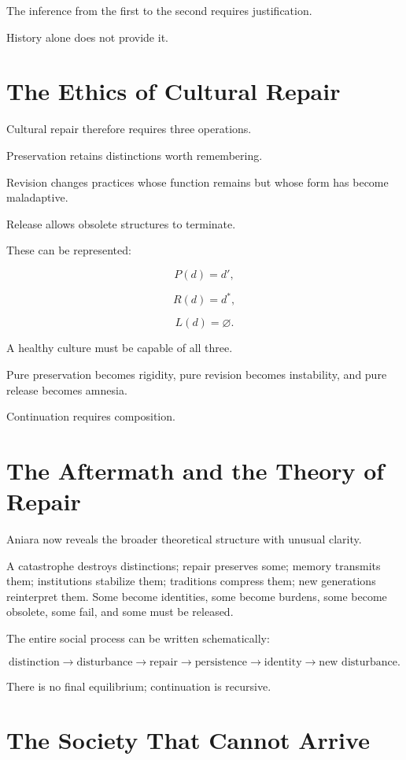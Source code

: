 \documentclass[11pt,oneside]{book}
\theoremstyle{definition}
\theoremstyle{remark}
\begin{document}
The inference from the first to the second requires justification.

History alone does not provide it.

\section{The Ethics of Cultural Repair}

Cultural repair therefore requires three operations.

Preservation retains distinctions worth remembering.

Revision changes practices whose function remains but whose form has become maladaptive.

Release allows obsolete structures to terminate.

These can be represented:

\[
P(d)=d',
\]

\[
R(d)=d^\ast,
\]

\[
L(d)=\varnothing.
\]

A healthy culture must be capable of all three.

Pure preservation becomes rigidity, pure revision becomes instability, and pure release becomes amnesia.

Continuation requires composition.

\section{The Aftermath and the Theory of Repair}

Aniara now reveals the broader theoretical structure with unusual clarity.

A catastrophe destroys distinctions; repair preserves some; memory transmits them; institutions stabilize them; traditions compress them; new generations reinterpret them. Some become identities, some become burdens, some become obsolete, some fail, and some must be released.

The entire social process can be written schematically:

\[
\text{distinction}
\rightarrow
\text{disturbance}
\rightarrow
\text{repair}
\rightarrow
\text{persistence}
\rightarrow
\text{identity}
\rightarrow
\text{new disturbance}.
\]

There is no final equilibrium; continuation is recursive.

\section{The Society That Cannot Arrive}
\end{document}
